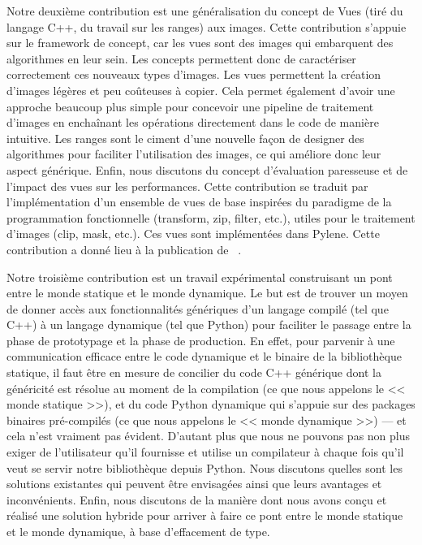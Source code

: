 \documentclass[11pt,a4paper,sans]{article} %
\begin{document}
Notre deuxième contribution est une généralisation du concept de Vues (tiré du langage C++, du travail sur les ranges)
aux images. Cette contribution s'appuie sur le framework de concept, car les vues sont des images qui embarquent des
algorithmes en leur sein. Les concepts permettent donc de caractériser correctement ces nouveaux types d'images. Les
vues permettent la création d'images légères et peu coûteuses à copier. Cela permet également d'avoir une approche
beaucoup plus simple pour concevoir une pipeline de traitement d'images en enchaînant les opérations directement dans le
code de manière intuitive. Les ranges sont le ciment d'une nouvelle façon de designer des algorithmes pour faciliter
l'utilisation des images, ce qui améliore donc leur aspect générique. Enfin, nous discutons du concept d'évaluation
paresseuse et de l'impact des vues sur les performances. Cette contribution se traduit par l'implémentation d'un
ensemble de vues de base inspirées du paradigme de la programmation fonctionnelle (transform, zip, filter, etc.), utiles
pour le traitement d'images (clip, mask, etc.). Ces vues sont implémentées dans Pylene. Cette contribution a donné lieu
à la publication de ~\parencite{roynard.2022.gpce}.

Notre troisième contribution est un travail expérimental construisant un pont entre le monde statique et le monde
dynamique. Le but est de trouver un moyen de donner accès aux fonctionnalités génériques d'un langage compilé (tel que
C++) à un langage dynamique (tel que Python) pour faciliter le passage entre la phase de prototypage et la phase de
production. En effet, pour parvenir à une communication efficace entre le code dynamique et le binaire de la
bibliothèque statique, il faut être en mesure de concilier du code C++ générique dont la généricité est résolue au
moment de la compilation (ce que nous appelons le << monde statique >>), et du code Python dynamique qui s'appuie sur
des packages binaires pré-compilés (ce que nous appelons le << monde dynamique >>) --- et cela n'est vraiment pas
évident. D'autant plus que nous ne pouvons pas non plus exiger de l'utilisateur qu'il fournisse et utilise un
compilateur à chaque fois qu'il veut se servir notre bibliothèque depuis Python. Nous discutons quelles sont les
solutions existantes qui peuvent être envisagées ainsi que leurs avantages et inconvénients. Enfin, nous discutons de la
manière dont nous avons conçu et réalisé une solution hybride pour arriver à faire ce pont entre le monde statique et le
monde dynamique, à base d'effacement de type.
\end{document}
